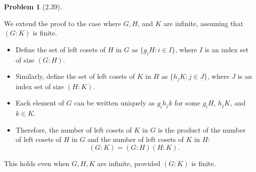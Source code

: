\documentclass[12pt]{article}
\theoremstyle{definition}
\newtheorem{problem}{Problem}
\begin{document}
\begin{problem}[2.39]
\begin{enumerate}[label=(\alph*)]
        \begin{solution}
            We extend the proof to the case where $G, H$, and $K$ are infinite, assuming that $(G:K)$ is finite.
            \begin{itemize}
                \item Define the set of left cosets of $H$ in $G$ as $\{g_i H : i \in I\}$, where $I$ is an index set of size $(G:H)$.
                \item Similarly, define the set of left cosets of $K$ in $H$ as $\{h_j K : j \in J\}$, where $J$ is an index set of size $(H:K)$.
                \item Each element of $G$ can be written uniquely as $g_i h_j k$ for some $g_i H$, $h_j K$, and $k \in K$.
                \item Therefore, the number of left cosets of $K$ in $G$ is the product of the number of left cosets of $H$ in $G$ and the number of left cosets of $K$ in $H$:
                \[
                (G:K) = (G:H)(H:K).
                \]
            \end{itemize}
            This holds even when $G, H, K$ are infinite, provided $(G:K)$ is finite.
        
        \end{solution}
    \end{enumerate}
\end{problem}
\end{document}
